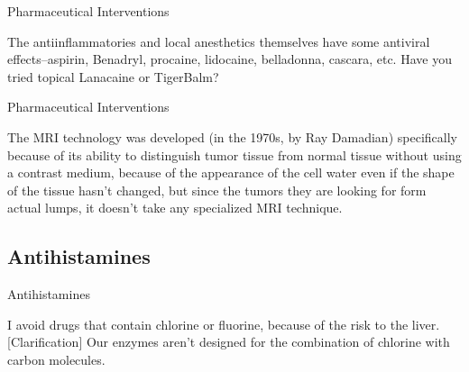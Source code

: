 \documentclass[11pt,oneside,openany,extrafontsizes]{memoir}
\begin{document}
\begin{standalonequote}{Pharmaceutical Interventions}

    \begin{answer}
      The antiinflammatories and local anesthetics themselves have some antiviral effects--aspirin, Benadryl, procaine, lidocaine, belladonna, cascara, etc. Have you tried topical Lanacaine or TigerBalm?
    \end{answer}
\end{standalonequote}

\begin{standalonequote}{Pharmaceutical Interventions}

    \begin{answer}
      The MRI technology was developed (in the 1970s, by Ray Damadian) specifically because of its ability to distinguish tumor tissue from normal tissue without using a contrast medium, because of the appearance of the cell water even if the shape of the tissue hasn't changed, but since the tumors they are looking for form actual lumps, it doesn't take any specialized MRI technique.
    \end{answer}
\end{standalonequote}

\subsection{Antihistamines}

\begin{standalonequote}{Antihistamines}

    \begin{answer}
        I avoid drugs that contain chlorine or fluorine, because of the risk to the liver. [Clarification] Our enzymes aren't designed for the combination of chlorine with carbon molecules.
    \end{answer}
\end{standalonequote}
\end{document}
